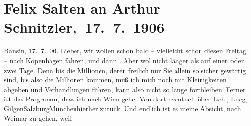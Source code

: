 

         
         \renewcommand{\erwaehntePersonen}{Personen: Felix Salten, Ottilie Salten, Olga Schnitzler}
         \renewcommand{\erwaehnteOrte}{Orte: Bad Ischl, Bansin, Deutschland, Kopenhagen, Lueg am Wolfgangsee, Marienlyst, München, Salzburg, St. Gilgen, Weimar, Wien}
         \renewcommand{\erwaehnteWerke}{}
               \section[ Felix Salten an Arthur Schnitzler, 17. 7. 1906]{ Felix Salten an Arthur Schnitzler, 17. 7. 1906}\nopagebreak{}\rehead{ }\begin{ledgroupsized}[t]{13cm}\normalsize\beginnumbering{} \toendnotes[C]{\smallbreak\pagebreak[2]} 
\toendnotes[C]{\smallbreak}\pstart
           \raggedleft{}{\pb}Bansin, 17. 7. 06.\pend
           \pstart
           Lieber, wir wollen schon bald – vielleicht schon diesen Freitag – nach Kopenhagen fahren, und dann \label{K_L03431-1v}\label{K_L03431-1h}. Aber wol nicht länger als auf einen oder zwei Tage. Denn bis die Millionen,
               deren freilich nur Sie allein so sicher gewärtig sind, bis also die Millionen kommen,
               muß ich mich noch mit Kleinigkeiten abgeben und Verhandlungen führen, kann also nicht
               so lange fortbleiben. Ferner ist das Programm, dass ich nach Wien gehe. Von dort eventuell über Ischl, Lueg, GilgenSalzburgMünchenhierher zurück. Und endlich
               ist es meine Absicht, nach Weimar zu gehen, weil

\end{ledgroupsized}
